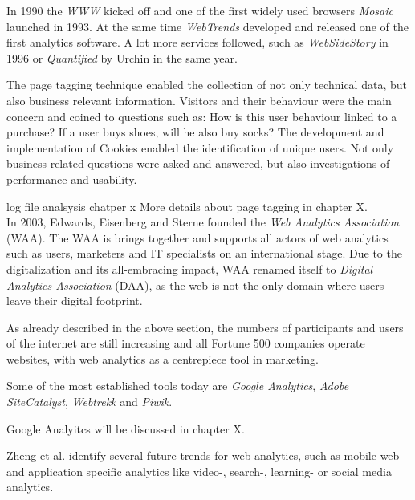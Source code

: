 
In 1990 the \textit{WWW} kicked off and one of the first widely used browsers \textit{Mosaic} launched in 1993.
At the same time \textit{WebTrends} developed and released one of the first analytics software.
A lot more services followed, such as \textit{WebSideStory} in 1996 %
or \textit{Quantified} by Urchin in the same year.%

The page tagging technique enabled the collection of not only technical data, but also business relevant information.
Visitors and their behaviour were the main concern and coined to questions such as: How is this user behaviour linked to a purchase? If a user buys shoes, will he also buy socks?
The development and implementation of Cookies enabled the identification of unique users.
Not only business related questions were asked and answered, but also investigations of performance and usability.

log file analsysis chatper x
More details about page tagging in chapter X.
\\


In 2003, Edwards, Eisenberg and Sterne founded the \textit{Web Analytics Association} (WAA).
The WAA is brings together and supports all actors of web analytics such as users, marketers and IT specialists on an international stage.
Due to the digitalization and its all-embracing impact, WAA renamed itself to \textit{Digital Analytics Association} (DAA), as the web is not the only domain where users leave their digital footprint.

As already described in the above section, the numbers of participants and users of the internet are still increasing and all Fortune 500 companies operate websites, with web analytics as a centrepiece tool in marketing. %

Some of the most established tools today are \textit{Google Analytics}, \textit{Adobe SiteCatalyst}, \textit{Webtrekk} and \textit{Piwik}. %

Google Analyitcs will be discussed in chapter X.

Zheng et al. identify several future trends for web analytics, such as mobile web and application specific analytics like video-, search-, learning- or social media analytics. %





